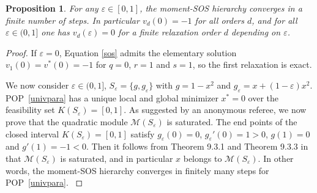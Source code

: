 \documentclass[a4paper,12pt]{article}
\newcommand{\cM}{\mathcal{M}} %
\newtheorem{proposition}{Proposition}
\begin{document}
{
\begin{proposition}
\label{prop:finitecvg}
For any $\varepsilon \in [0,1]$,
the moment-SOS hierarchy converges in a finite number of steps.  In particular $v_d(0)=-1$ for all orders $d$, and for all $\varepsilon \in (0, 1]$ one has  $v_d(\varepsilon)=0$ for a finite relaxation order $d$  depending on $\varepsilon$.
\end{proposition}
}
\begin{proof}
    If $\varepsilon = 0$, Equation \eqref{sos} admits the elementary solution $v_1(0)=v^*(0)=-1$ for $q=0$, $r=1$ and $s=1$, so the first relaxation is exact.

{
We now consider $\varepsilon \in (0,1]$, $S_{\varepsilon} = \{g, g_{\varepsilon} \}$ with $g=1-x^2$ and $g_{\varepsilon} = x + (1-\varepsilon)x^2$. 
POP~\eqref{univpara} has a unique local and global minimizer $x^* = 0$ over the feasibility set  $K(S_{\varepsilon})=[0,1]$. 
As suggested by an anonymous referee, 
we now prove that the quadratic module  $\cM(S_{\varepsilon})$ is saturated. 
The end points of the closed interval $K(S_{\varepsilon})= [0, 1]$ satisfy $g_{\varepsilon}(0) = 0 $, $g_{\varepsilon}'(0) = 1 > 0$, $g(1)=0$ and $g'(1) = -1 < 0$. 
Then it follows from Theorem 9.3.1 and Theorem 9.3.3 in \cite{marshall08} that $\cM(S_{\varepsilon})$ is saturated, and in particular $x$ belongs to $\cM(S_{\varepsilon})$. 
In other words, the moment-SOS hierarchy converges in finitely many steps for POP~\eqref{univpara}. 
}        
\end{proof}
%
\end{document}
